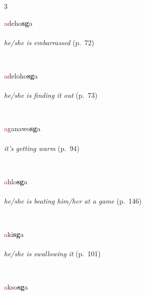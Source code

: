 \documentclass[oneside,openany]{book}%
\begin{document}
\noindent\begin{multicols}{3}%
\begin{minipage}[t]{\linewidth}
\raggedright\noindent \textcolor{Red}{a}deho\textbf{sg}a\\
\\
\noindent \textit{he/she is embarrassed} (p.~72)
\end{minipage}\\[1em]%
\begin{minipage}[t]{\linewidth}
\raggedright\noindent \textcolor{Red}{a}deloho\textbf{sg}a\\
\\
\noindent \textit{he/she is finding it out} (p.~73)
\end{minipage}\\[1em]%
\begin{minipage}[t]{\linewidth}
\raggedright\noindent \textcolor{Red}{a}ganawo\textbf{sg}a\\
\\
\noindent \textit{it's getting warm} (p.~94)
\end{minipage}\\[1em]%
\begin{minipage}[t]{\linewidth}
\raggedright\noindent \textcolor{Red}{a}hlo\textbf{sg}a\\
\\
\noindent \textit{he/she is beating him/her at a game} (p.~146)
\end{minipage}\\[1em]%
\begin{minipage}[t]{\linewidth}
\raggedright\noindent \textcolor{Red}{a}ki\textbf{sg}a\\
\\
\noindent \textit{he/she is swallowing it} (p.~101)
\end{minipage}\\[1em]%
\begin{minipage}[t]{\linewidth}
\raggedright\noindent \textcolor{Red}{a}kso\textbf{sg}a\\
\\

\end{minipage}
\end{multicols}
\end{document}
